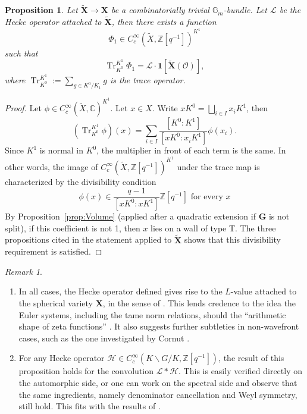 \documentclass{amsart}
\newtheorem{prop}[theorem]{Proposition}
\theoremstyle{definition}
\theoremstyle{remark}
\newtheorem{remark}[theorem]{Remark}
\newcommand{\1}{\mathbf{1}}
\newcommand{\C}{\mathbb{C}}
\newcommand{\G}{\mathbf{G}}
\newcommand{\mb}[1]{\mathbf{#1}}
\newcommand{\Or}{\mathcal{O}}
\newcommand{\sh}[1]{\mathcal{#1}}
\newcommand{\Z}{\mathbb{Z}}
\DeclareMathOperator{\Tr}{Tr}
\theoremstyle{definition}
\renewcommand{\G}{\mathbb{G}}
\newcommand{\indf}{\mathbf{1}}
\newcommand{\tX}{{\widetilde{X}}}
\begin{document}
\begin{prop}\label{prop:MainCorollary}
  Let $\tilde{\mb{X}}\to\mb{X}$ be a combinatorially trivial $\G_m$-bundle. Let $\sh{L}$ be the Hecke operator attached to $\tilde{\mb{X}}$, then there exists a function
  \[
    \Phi_1\in C_c^\infty(\tX,\Z[q^{-1}])^{K^1}
  \]
  such that
  \[
    \Tr_{K^0}^{K^1}\Phi_1=\sh{L}\cdot\indf[\widetilde{\mb{X}}(\Or)],
  \]
  where $\Tr_{K^0}^{K^1}:=\sum_{g\in K^0/K_1}g$ is the trace operator.
\end{prop}
\begin{proof}
  Let $\phi\in C_c^\infty(\tX,\C)^{K^1}$. Let $x\in X$. Write $xK^0=\bigsqcup_{i\in I}x_i K^1$, then
  \[
    (\Tr_{K^0}^{K^1}\phi)(x)=\sum_{i\in I}\frac{[K^0:K^1]}{[xK^0:x_iK^1]}\phi(x_i).
  \]
  Since $K^1$ is normal in $K^0$, the multiplier in front of each term is the same. In other words, the image of $C_c^\infty(\tX,\Z[q^{-1}])^{K^1}$ under the trace map is characterized by the divisibility condition
  \[
    \phi(x)\in\frac{q-1}{[xK^0:xK^1]}\Z[q^{-1}]\text{ for every }x
  \]
  By Proposition~\ref{prop:Volume} (applied after a quadratic extension if $\mb{G}$ is not split), if this coefficient is not 1, then $x$ lies on a wall of type T. The three propositions cited in the statement applied to $\widetilde{\mb{X}}$ shows that this divisibility requirement is satisfied.
\end{proof}

\begin{remark}\label{rmk:1}
\begin{enumerate}
    \item In all cases, the Hecke operator defined gives rise to the $L$-value attached to the spherical variety $\mathbf{X}$, in the sense of \cite[Definition 7.2.3]{SakSpherical}. This lends credence to the idea the Euler systems, including the tame norm relations, should the ``arithmetic shape of zeta functions'' \cite{KatoEulerSystem}. It also suggests further subtleties in non-wavefront cases, such as the one investigated by Cornut \cite{CornutES}.
    \item For any Hecke operator $\sh{H}\in C_c^\infty(K\backslash G/K,\Z[q^{-1}])$, the result of this proposition holds for the convolution $\sh{L}\ast\sh{H}$. This is easily verified directly on the automorphic side, or one can work on the spectral side and observe that the same ingredients, namely denominator cancellation and Weyl symmetry, still hold. This fits with the results of \cite{GroutidesRS}.
\end{enumerate}
\end{remark}
\end{document}
